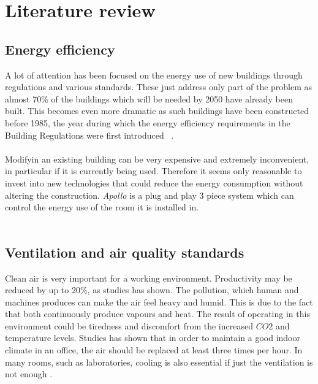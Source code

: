 \documentclass[12pt,a4paper]{report}
\begin{document}
\chapter{Literature review}
%
\section{Energy efficiency}
A lot of attention has been focused on the energy use of new buildings through regulations and various standards. These just address only part of the problem as almost 70\% of the buildings which will be needed by 2050 have already been built. This becomes even more dramatic as such buildings have been constructed before 1985, the year during which the energy efficiency requirements in the Building Regulations were first introduced ~\cite{website:building_reg,website:carbon_trust}.
\ \\
\ \\
Modifyin an existing building can be very expensive and extremely inconvenient, in particular if it is currently being used. Therefore it seems only reasonable to invest into new technologies that could reduce the energy consumption without altering the construction. \emph{Apollo} is a plug and play 3 piece system which can control the energy use of the room it is installed in.\\
\ \\
%
\section {Ventilation and air quality standards}
Clean air is very important for a working environment. Productivity may be reduced by up to 20\%, as studies has shown. The pollution, which human and machines produces can make the air feel heavy and humid. This is due to the fact that both continuously produce vapours and heat. The result of operating in this environment could be tiredness and discomfort from the increased $CO2$ and temperature levels. Studies has shown that in order to maintain a good indoor climate in an office, the air should be replaced at least three times per hour. In many rooms, such as laboratories, cooling is also essential if just the ventilation is not enough \cite{website:ventilation}.
%
\end{document}
